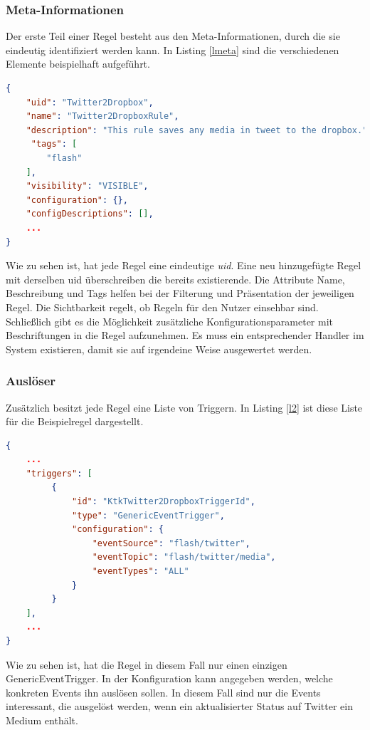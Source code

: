 \subsubsection{Meta-Informationen}
Der erste Teil einer Regel besteht aus den Meta-Informationen, durch die sie eindeutig identifiziert werden kann. In Listing \ref{lmeta} sind die verschiedenen Elemente beispielhaft aufgeführt.

\begin{lstlisting}[language=json,firstnumber=1, caption=Meta-Informationen einer Regel im JSON Format, captionpos=b, label=lmeta]
{
    "uid": "Twitter2Dropbox",
    "name": "Twitter2DropboxRule",
    "description": "This rule saves any media in tweet to the dropbox.",
     "tags": [
        "flash"
    ],
    "visibility": "VISIBLE",
    "configuration": {},
    "configDescriptions": [],
    ...
}
\end{lstlisting}

Wie zu sehen ist, hat jede Regel eine eindeutige \textit{uid}. Eine neu hinzugefügte Regel mit derselben uid überschreiben die bereits existierende. Die Attribute Name, Beschreibung und Tags helfen bei der Filterung und Präsentation der jeweiligen Regel. Die Sichtbarkeit regelt, ob Regeln für den Nutzer einsehbar sind. Schließlich gibt es die Möglichkeit zusätzliche Konfigurationsparameter mit Beschriftungen in die Regel aufzunehmen. Es muss ein entsprechender Handler im System existieren, damit sie auf irgendeine Weise ausgewertet werden.

\subsubsection{Auslöser}
Zusätzlich besitzt jede Regel eine Liste von Triggern. In Listing \ref{l2} ist diese Liste für die Beispielregel dargestellt.
\begin{lstlisting}[language=json,firstnumber=1, caption=Die Liste der Trigger im JSON Format, captionpos=b, label=l2]
{
    ...
    "triggers": [
	     {
	         "id": "KtkTwitter2DropboxTriggerId",
	         "type": "GenericEventTrigger",
	         "configuration": {
	             "eventSource": "flash/twitter",
	             "eventTopic": "flash/twitter/media",
	             "eventTypes": "ALL"
	         }	         
	     }
    ],
    ...
}            
\end{lstlisting}
Wie zu sehen ist, hat die Regel in diesem Fall nur einen einzigen GenericEventTrigger. In der Konfiguration kann angegeben werden, welche konkreten Events ihn auslösen sollen. In diesem Fall sind nur die Events interessant, die ausgelöst werden, wenn ein aktualisierter Status auf Twitter ein Medium enthält.

